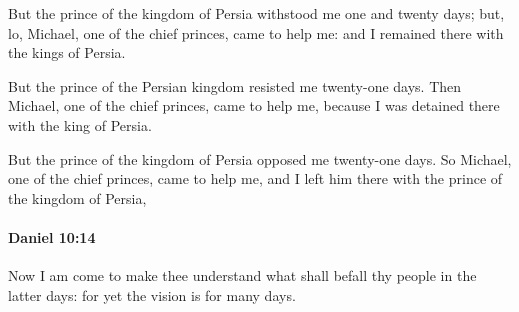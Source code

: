 			\begin{versebox}
					\item[BHS] 
					\item[LXX] 
					\item[ASV] But the prince of the kingdom of Persia withstood me one and twenty days; but, lo, Michael, one of the chief princes, came to help me: and I remained there with the kings of Persia.
					\item[NIV] But the prince of the Persian kingdom resisted me twenty-one days. Then Michael, one of the chief princes, came to help me, because I was detained there with the king of Persia.
					\item[NRSV] But the prince of the kingdom of Persia opposed me twenty-one days. So Michael, one of the chief princes, came to help me, and I left him there with the prince of the kingdom of Persia,
			\end{versebox}

		\paragraph{Daniel 10:14} %
			\label{DANIEL-10-14}

			Now I am come to make thee understand what shall befall thy people in the latter days: for yet the vision is for many days.

